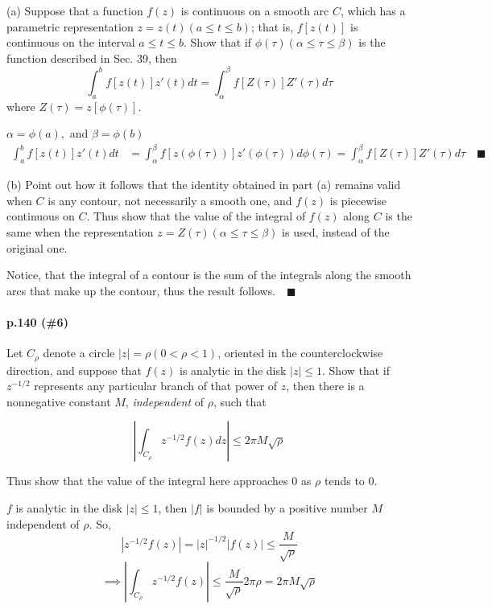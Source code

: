 \documentclass{article}
\begin{document}
(a) Suppose that a function $f (z)$ is continuous on a smooth arc $C$, which has a
parametric representation $z = z(t) (a ≤ t ≤ b)$; that is, $f [z(t)]$ is continuous on
the interval $a ≤ t ≤ b$. Show that if $\phi(\tau ) (\alpha \leq \tau
\leq \beta)$ is the function described in Sec. 39, then
\[\int_a^b f[z(t)]z'(t)dt = \int_\alpha^\beta f[Z(\tau)]Z'(\tau)d\tau\]
 where $Z(\tau) = z[\phi(\tau )]$.


$\alpha = \phi(a),$ and $\beta = \phi(b)$
\begin{align*}
  \int_a^b f[z(t)]z'(t)dt &= \int_\alpha^\beta
                            f[z(\phi(\tau))]z'(\phi(\tau))d\phi(\tau)
                            = \int_\alpha^\beta
                            f[Z(\tau)]Z'(\tau)d\tau \quad \blacksquare
\end{align*}

(b) Point out how it follows that the identity obtained in part (a) remains valid when
$C$ is any contour, not necessarily a smooth one, and $f (z)$ is piecewise continuous
on $C$. Thus show that the value of the integral of $f (z)$ along $C$ is the same when
the representation $z = Z(\tau ) (\alpha \leq \tau \leq \beta)$ is used, instead of the original one.

 Notice, that the integral of a contour is the sum
of the integrals along the smooth arcs that make up the contour, thus
the result follows.$\quad \blacksquare$

\paragraph{p.140 \color{blue}(\#6)\color{black}}
 Let $C_\rho$ denote a circle $|z| = \rho (0 < ρ < 1)$, oriented in the counterclockwise direction,
and suppose that $f (z)$ is analytic in the disk $|z| ≤ 1$. Show that if $z^{-1/2}$ represents
any particular branch of that power of $z$, then there is a nonnegative constant $M$,
\textit{independent} of $\rho$, such that

\[\left| \int_{C_\rho} z^{-1/2} f(z) dz \right|\leq 2\pi M\sqrt{\rho}\]

Thus show that the value of the integral here approaches $0$ as $ρ$
tends to $0$.


$f$ is analytic in the disk $|z|\leq 1$, then $|f|$ is bounded by a
positive number $M$ independent of $\rho.$ So,
\[|z^{-1/2}f(z)| = |z|^{-1/2}|f(z)| \leq \frac{M}{\sqrt{\rho}}\]
\[\implies \left|\int_{C_\rho }z^{-1/2}f(z)\right| \leq
  \frac{M}{\sqrt{\rho}}2\pi \rho = 2\pi M\sqrt{\rho}\]
\end{document}
